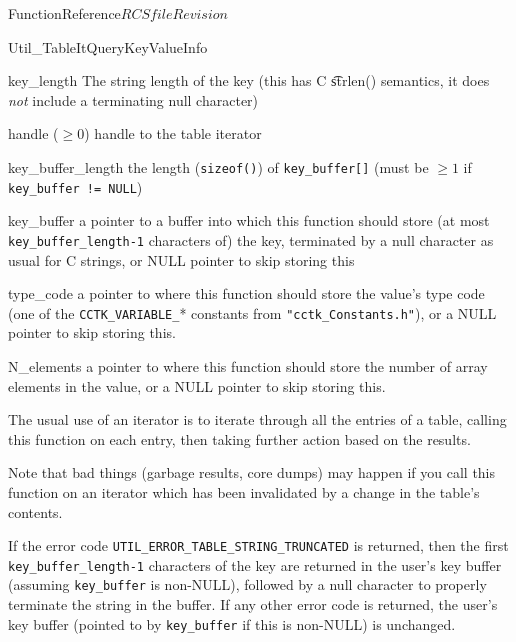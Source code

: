 \begin{cactuspart}{FunctionReference}{$RCSfile$}{$Revision$}
\begin{FunctionDescription}{Util\_TableItQueryKeyValueInfo}
\begin{ResultSection}
\begin{Result}{key\_length}
The string length of the key
(this has C {\t strlen()} semantics, \ie{} it does {\em not\/}
include a terminating null character)
\end{Result}
\end{ResultSection}

\begin{ParameterSection}
\begin{Parameter}{handle ($\ge 0$)}
handle to the table iterator
\end{Parameter}
\begin{Parameter}{key\_buffer\_length}
\quad
the length (\verb|sizeof()|) of \verb|key_buffer[]|
(must be $\ge 1$ if \verb|key_buffer != NULL|)
\end{Parameter}
\begin{Parameter}{key\_buffer}
a pointer to a buffer into which this function should store
(at most \verb|key_buffer_length-1| characters of) the key,
terminated by a null character as usual for C strings,
or NULL pointer to skip storing this
\end{Parameter}
\begin{Parameter}{type\_code}
a pointer to where this function should store the value's type code
(one of the \verb|CCTK_VARIABLE_|* constants from \verb|"cctk_Constants.h"|),
or a NULL pointer to skip storing this.
\end{Parameter}
\begin{Parameter}{N\_elements}
a pointer to where this function should store
the number of array elements in the value,
or a NULL pointer to skip storing this.
\end{Parameter}
\end{ParameterSection}

\begin{Discussion}
The usual use of an iterator is to iterate through all the entries
of a table, calling this function on each entry, then taking further
action based on the results.

Note that bad things (garbage results, core dumps) may happen if
you call this function on an iterator which has been invalidated
by a change in the table's contents.

If the error code \verb|UTIL_ERROR_TABLE_STRING_TRUNCATED| is returned,
then the first \verb|key_buffer_length-1| characters of the key are
returned in the user's key buffer (assuming \verb|key_buffer| is non-NULL),
followed by a null character to properly terminate the string in the
buffer.  If any other error code is returned, the user's key buffer
(pointed to by \verb|key_buffer| if this is non-NULL) is unchanged.
\end{Discussion}


\end{FunctionDescription}
\end{cactuspart}
